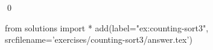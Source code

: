 
\begin{ex} 
  \label{ex:counting-sort3}
  
  \qed
\end{ex} 
\begin{python0}
from solutions import *
add(label="ex:counting-sort3",
    srcfilename='exercises/counting-sort3/answer.tex') 
\end{python0}
